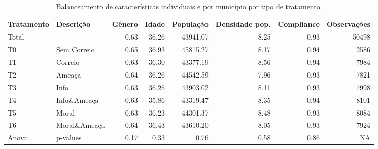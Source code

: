 \begin{table}[H]

\caption{\label{tab:tab1}Balanceamento de características individuais e por município por tipo de tratamento.}
\centering
\fontsize{10}{12}\selectfont
\begin{tabular}[t]{llrrrrrr}
\toprule
Tratamento & Descrição & Gênero & Idade & População & Densidade pop. & Compliance & Observações\\
\midrule
Total &  & 0.63 & 36.26 & 43941.07 & 8.25 & 0.93 & 50498\\
T0 & Sem Correio & 0.65 & 36.93 & 45815.27 & 8.17 & 0.94 & 2586\\
T1 & Correio & 0.63 & 36.30 & 43377.19 & 8.56 & 0.94 & 7984\\
T2 & Ameaça & 0.64 & 36.26 & 44542.59 & 7.96 & 0.93 & 7821\\
T3 & Info & 0.63 & 36.26 & 43903.02 & 8.11 & 0.93 & 7998\\
\addlinespace
T4 & Info\&Ameaça & 0.63 & 35.86 & 43319.47 & 8.35 & 0.94 & 8101\\
T5 & Moral & 0.63 & 36.23 & 44301.37 & 8.48 & 0.93 & 8084\\
T6 & Moral\&Ameaça & 0.64 & 36.43 & 43610.20 & 8.05 & 0.93 & 7924\\
Anova: & p-values & 0.17 & 0.33 & 0.76 & 0.58 & 0.86 & NA\\
\bottomrule
\end{tabular}
\end{table}
